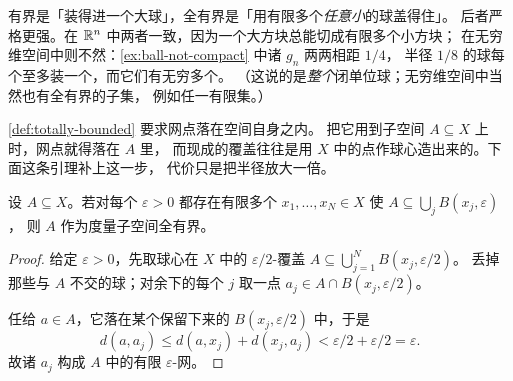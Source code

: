 \begin{intuition}
  有界是「装得进一个大球」，全有界是「用有限多个\emph{任意小}的球盖得住」。
  后者严格更强。在 \(\mathbb{R}^{n}\) 中两者一致，因为一个大方块总能切成有限多个小方块；
  在无穷维空间中则不然：\cref{ex:ball-not-compact} 中诸 \(g_{n}\) 两两相距 \(1/4\)，
  半径 \(1/8\) 的球每个至多装一个，而它们有无穷多个。
  （这说的是\emph{整个}闭单位球；无穷维空间中当然也有全有界的子集，
  例如任一有限集。）
\end{intuition}

\cref{def:totally-bounded} 要求网点落在空间自身之内。
把它用到子空间 \(A \subseteq X\) 上时，网点就得落在 \(A\) 里，
而现成的覆盖往往是用 \(X\) 中的点作球心造出来的。下面这条引理补上这一步，
代价只是把半径放大一倍。

\begin{lemma}[网点可移入子集]
  \label{lem:net-into-subset}
  设 \(A \subseteq X\)。若对每个 \(\varepsilon>0\) 都存在有限多个
  \(x_{1},\dots,x_{N} \in X\) 使 \(A \subseteq \bigcup_{j} B(x_{j},\varepsilon)\)，
  则 \(A\) 作为度量子空间全有界。
\end{lemma}

\begin{proof}
  给定 \(\varepsilon>0\)，先取球心在 \(X\) 中的 \(\varepsilon/2\)-覆盖
  \(A \subseteq \bigcup_{j=1}^{N} B(x_{j},\varepsilon/2)\)。
  丢掉那些与 \(A\) 不交的球；对余下的每个 \(j\) 取一点
  \(a_{j} \in A \cap B(x_{j},\varepsilon/2)\)。

  任给 \(a \in A\)，它落在某个保留下来的 \(B(x_{j},\varepsilon/2)\) 中，于是
  \[
    d(a,a_{j}) \le d(a,x_{j}) + d(x_{j},a_{j}) < \varepsilon/2 + \varepsilon/2 = \varepsilon .
  \]
  故诸 \(a_{j}\) 构成 \(A\) 中的有限 \(\varepsilon\)-网。
\end{proof}

